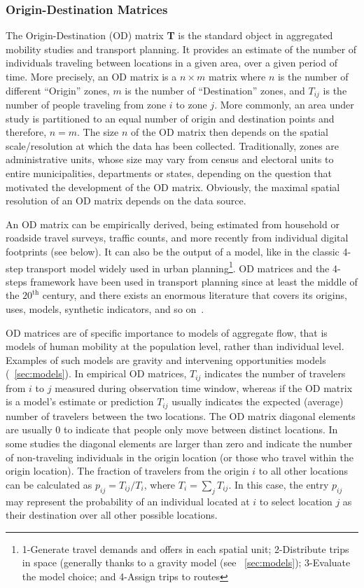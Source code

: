 \subsubsection{Origin-Destination Matrices}\label{sec:odmatrix}

The Origin-Destination (OD) matrix {\bf T} is the standard object in aggregated mobility studies and transport planning. It provides an estimate of the number of individuals traveling between locations in a given area, over a given period of time. More precisely, an OD matrix is a $n\times m$ matrix where $n$ is the number of different ``Origin'' zones, $m$ is the number of ``Destination'' zones, and $T_{ij}$ is the number of people traveling from zone $i$ to
zone $j$. More commonly, an area under study is partitioned to an equal number of origin and destination points and therefore, $n=m$. The size $n$ of the OD matrix then depends on the spatial scale/resolution at which the data has been collected. Traditionally, zones are administrative units, whose size may vary from census and electoral units to entire municipalities, departments or states, depending on the question that motivated the development of the OD matrix. Obviously, the maximal spatial resolution of an OD matrix depends on the data source.

An OD matrix can be empirically derived, being estimated from
household or roadside travel surveys, traffic counts, and more
recently from individual digital footprints (see below). It can
also be the output of a model, like in the classic 4-step transport
model widely used in urban planning\footnote{1-Generate travel demands and offers in each spatial unit; 2-Distribute trips in space (generally thanks to a gravity model (see \sectionname~\ref{sec:models}); 3-Evaluate the model choice; and 4-Assign trips to routes}. OD
matrices and the 4-steps framework have been used in transport
planning since at least the middle of the $20^{\text{th}}$ century, and there exists an enormous literature that covers its origins, uses, models, synthetic indicators, and so on~\cite{ortuzar_2011_modeling}. 


OD matrices are of specific importance to models of aggregate flow, that is models of human mobility at the population level, rather than individual level. Examples of such models are gravity and intervening opportunities models (\sectionname~\ref{sec:models}). 
In empirical OD matrices, $T_{ij}$ indicates the number of travelers from $i$ to $j$ measured during observation time window, whereas if the OD matrix is a model's estimate or prediction $T_{ij}$ usually indicates the expected (average) number of travelers between the two locations. The OD matrix diagonal elements are usually 0 to indicate that people only move between distinct locations. In some studies the diagonal elements are larger than zero and indicate the number of non-traveling individuals in the origin location (or those who travel within the origin location). 
The fraction of travelers from the origin $i$ to all other locations can be calculated as $p_{ij} = T_{ij} / T_i$,  where $T_i = \sum_j T_{ij}$. In this case, the entry $p_{ij}$ may represent the probability of an individual located at $i$ to select location $j$ as their destination over all other possible locations.

